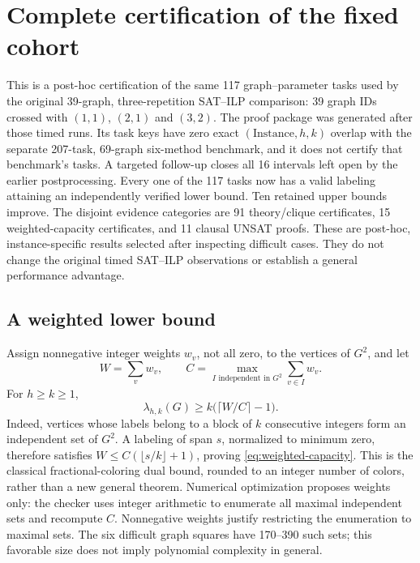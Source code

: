 \section{Complete certification of the fixed cohort}
\label{sec:proof-closure}
This is a post-hoc certification of the same 117 graph--parameter tasks
used by the original 39-graph, three-repetition SAT--ILP comparison:
39 graph IDs crossed with $(1,1)$, $(2,1)$ and $(3,2)$. The proof package
was generated after those timed runs. Its task keys have zero exact
$(\text{Instance},h,k)$ overlap with the separate 207-task, 69-graph
six-method benchmark, and it does not certify that benchmark's tasks.
A targeted follow-up closes all 16 intervals left open by the earlier
postprocessing. Every one of the 117 tasks now has a valid labeling
attaining an independently verified lower bound. Ten retained upper bounds
improve. The disjoint evidence categories are 91 theory/clique certificates,
15 weighted-capacity certificates, and 11 clausal UNSAT proofs. These are
post-hoc, instance-specific results selected after inspecting difficult
cases. They do not change the original timed SAT--ILP observations or
establish a general performance advantage.

\subsection{A weighted lower bound}
Assign nonnegative integer weights $w_v$, not all zero, to the vertices of
$G^2$, and let
\[
 W=\sum_v w_v,\qquad C=\max_{I\text{ independent in }G^2}\sum_{v\in I}w_v.
\]
For $h\ge k\ge1$,
\begin{equation}
 \lambda_{h,k}(G)\ge k\bigl(\lceil W/C\rceil-1\bigr).
 \label{eq:weighted-capacity}
\end{equation}
Indeed, vertices whose labels belong to a block of $k$ consecutive integers
form an independent set of $G^2$. A labeling of span $s$, normalized to
minimum zero, therefore satisfies
$W\le C(\lfloor s/k\rfloor+1)$, proving
\eqref{eq:weighted-capacity}. This is the classical fractional-coloring
dual bound, rounded to an integer number of colors, rather than a new
general theorem. Numerical optimization proposes weights only: the checker
uses integer arithmetic to enumerate all maximal independent sets and
recompute $C$. Nonnegative weights justify restricting the enumeration to
maximal sets. The six difficult graph squares have 170--390 such sets;
this favorable size does not imply polynomial complexity in general.


